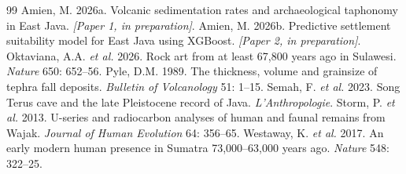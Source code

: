 \documentclass[12pt]{article}
\begin{document}
\begin{thebibliography}{99}
 Amien, M. 2026a. Volcanic sedimentation rates and archaeological taphonomy in East Java. \textit{[Paper 1, in preparation]}.
 Amien, M. 2026b. Predictive settlement suitability model for East Java using XGBoost. \textit{[Paper 2, in preparation]}.
 Oktaviana, A.A. \textit{et al.} 2026. Rock art from at least 67,800 years ago in Sulawesi. \textit{Nature} 650: 652--56.
 Pyle, D.M. 1989. The thickness, volume and grainsize of tephra fall deposits. \textit{Bulletin of Volcanology} 51: 1--15.
 Semah, F. \textit{et al.} 2023. Song Terus cave and the late Pleistocene record of Java. \textit{L'Anthropologie}.
 Storm, P. \textit{et al.} 2013. U-series and radiocarbon analyses of human and faunal remains from Wajak. \textit{Journal of Human Evolution} 64: 356--65.
 Westaway, K. \textit{et al.} 2017. An early modern human presence in Sumatra 73,000--63,000 years ago. \textit{Nature} 548: 322--25.
\end{thebibliography}
\end{document}
